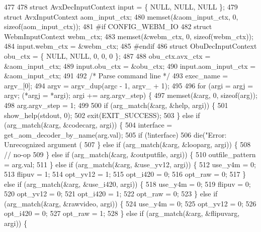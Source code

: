 \begin{DoxyCodeInclude}
{{{{{{{{{{{{{{{{{{{{{{{{{477 
478   \textcolor{keyword}{struct }AvxDecInputContext input = \{ NULL, NULL, NULL \};
479   \textcolor{keyword}{struct }AvxInputContext aom\_input\_ctx;
480   memset(&aom\_input\_ctx, 0, \textcolor{keyword}{sizeof}(aom\_input\_ctx));
481 \textcolor{preprocessor}{#if CONFIG\_WEBM\_IO}
482   \textcolor{keyword}{struct }WebmInputContext webm\_ctx;
483   memset(&webm\_ctx, 0, \textcolor{keyword}{sizeof}(webm\_ctx));
484   input.webm\_ctx = &webm\_ctx;
485 \textcolor{preprocessor}{#endif}
486   \textcolor{keyword}{struct }ObuDecInputContext obu\_ctx = \{ NULL, NULL, 0, 0, 0 \};
487 
488   obu\_ctx.avx\_ctx = &aom\_input\_ctx;
489   input.obu\_ctx = &obu\_ctx;
490   input.aom\_input\_ctx = &aom\_input\_ctx;
491 
492   \textcolor{comment}{/* Parse command line */}
493   exec\_name = argv\_[0];
494   argv = argv\_dup(argc - 1, argv\_ + 1);
495 
496   \textcolor{keywordflow}{for} (argi = argj = argv; (*argj = *argi); argi += arg.argv\_step) \{
497     memset(&arg, 0, \textcolor{keyword}{sizeof}(arg));
498     arg.argv\_step = 1;
499 
500     \textcolor{keywordflow}{if} (arg\_match(&arg, &help, argi)) \{
501       show\_help(stdout, 0);
502       exit(EXIT\_SUCCESS);
503     \} \textcolor{keywordflow}{else} \textcolor{keywordflow}{if} (arg\_match(&arg, &codecarg, argi)) \{
504       \textcolor{keyword}{interface }= get\_aom\_decoder\_by\_name(arg.val);
505       \textcolor{keywordflow}{if} (!interface)
506         die(\textcolor{stringliteral}{"Error: Unrecognized argument (%
507     \} \textcolor{keywordflow}{else} \textcolor{keywordflow}{if} (arg\_match(&arg, &looparg, argi)) \{
508       \textcolor{comment}{// no-op}
509     \} \textcolor{keywordflow}{else} \textcolor{keywordflow}{if} (arg\_match(&arg, &outputfile, argi)) \{
510       outfile\_pattern = arg.val;
511     \} \textcolor{keywordflow}{else} \textcolor{keywordflow}{if} (arg\_match(&arg, &use\_yv12, argi)) \{
512       use\_y4m = 0;
513       flipuv = 1;
514       opt\_yv12 = 1;
515       opt\_i420 = 0;
516       opt\_raw = 0;
517     \} \textcolor{keywordflow}{else} \textcolor{keywordflow}{if} (arg\_match(&arg, &use\_i420, argi)) \{
518       use\_y4m = 0;
519       flipuv = 0;
520       opt\_yv12 = 0;
521       opt\_i420 = 1;
522       opt\_raw = 0;
523     \} \textcolor{keywordflow}{else} \textcolor{keywordflow}{if} (arg\_match(&arg, &rawvideo, argi)) \{
524       use\_y4m = 0;
525       opt\_yv12 = 0;
526       opt\_i420 = 0;
527       opt\_raw = 1;
528     \} \textcolor{keywordflow}{else} \textcolor{keywordflow}{if} (arg\_match(&arg, &flipuvarg, argi)) \{
}}}}}}}}}}}}}}}}}}}}}}}}}}
\end{DoxyCodeInclude}

